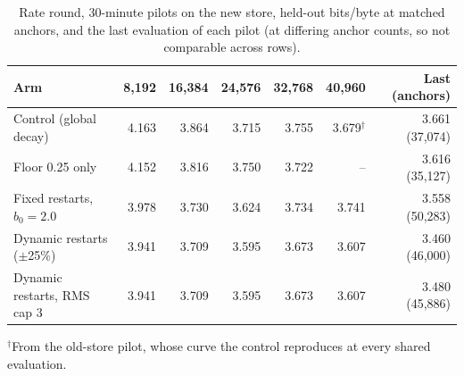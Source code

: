 \documentclass[10pt]{article}
\newcommand{\bpb}{bits/byte}
\begin{document}
\begin{table}[t]
\centering
\caption{Rate round, 30-minute pilots on the new store, held-out \bpb{} at matched anchors, and the
last evaluation of each pilot (at differing anchor counts, so not comparable across rows).}
\label{tab:rate}
\begin{tabular}{lrrrrrr}
\toprule
Arm & 8,192 & 16,384 & 24,576 & 32,768 & 40,960 & Last (anchors) \\
\midrule
Control (global decay) & 4.163 & 3.864 & 3.715 & 3.755 & 3.679$^\dagger$ & 3.661 (37,074) \\
Floor 0.25 only & 4.152 & 3.816 & 3.750 & 3.722 & -- & 3.616 (35,127) \\
Fixed restarts, $b_0=2.0$ & 3.978 & 3.730 & 3.624 & 3.734 & 3.741 & 3.558 (50,283) \\
Dynamic restarts ($\pm$25\%) & 3.941 & 3.709 & 3.595 & 3.673 & 3.607 & 3.460 (46,000) \\
Dynamic restarts, RMS cap 3 & 3.941 & 3.709 & 3.595 & 3.673 & 3.607 & 3.480 (45,886) \\
\bottomrule
\end{tabular}

\smallskip
{\footnotesize $^\dagger$From the old-store pilot, whose curve the control reproduces at every shared evaluation.}
\end{table}
\end{document}
